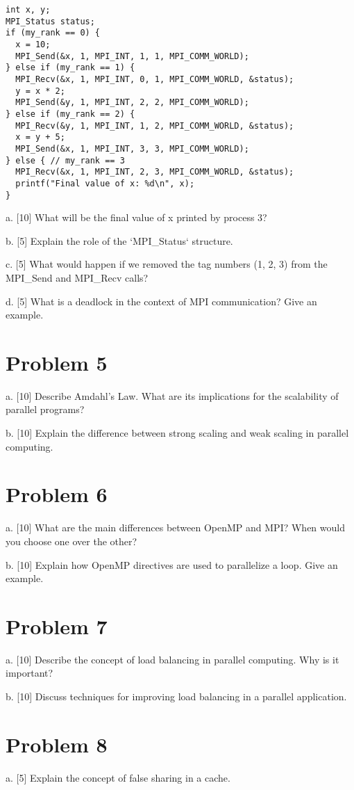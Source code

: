 \documentclass{article}
\begin{document}
\begin{verbatim}
int x, y;
MPI_Status status;
if (my_rank == 0) {
  x = 10;
  MPI_Send(&x, 1, MPI_INT, 1, 1, MPI_COMM_WORLD);
} else if (my_rank == 1) {
  MPI_Recv(&x, 1, MPI_INT, 0, 1, MPI_COMM_WORLD, &status);
  y = x * 2;
  MPI_Send(&y, 1, MPI_INT, 2, 2, MPI_COMM_WORLD);
} else if (my_rank == 2) {
  MPI_Recv(&y, 1, MPI_INT, 1, 2, MPI_COMM_WORLD, &status);
  x = y + 5;
  MPI_Send(&x, 1, MPI_INT, 3, 3, MPI_COMM_WORLD);
} else { // my_rank == 3
  MPI_Recv(&x, 1, MPI_INT, 2, 3, MPI_COMM_WORLD, &status);
  printf("Final value of x: %d\n", x);
}
\end{verbatim}

a. [10] What will be the final value of x printed by process 3?

b. [5] Explain the role of the `MPI_Status` structure.

c. [5] What would happen if we removed the tag numbers (1, 2, 3) from the MPI_Send and MPI_Recv calls?

d. [5] What is a deadlock in the context of MPI communication?  Give an example.


\section*{Problem 5}
a. [10] Describe Amdahl's Law. What are its implications for the scalability of parallel programs?

b. [10] Explain the difference between strong scaling and weak scaling in parallel computing.

\section*{Problem 6}
a. [10]  What are the main differences between OpenMP and MPI?  When would you choose one over the other?

b. [10] Explain how OpenMP directives are used to parallelize a loop. Give an example.


\section*{Problem 7}
a. [10] Describe the concept of load balancing in parallel computing. Why is it important?

b. [10] Discuss techniques for improving load balancing in a parallel application.

\section*{Problem 8}
a. [5] Explain the concept of false sharing in a cache.
\end{document}
